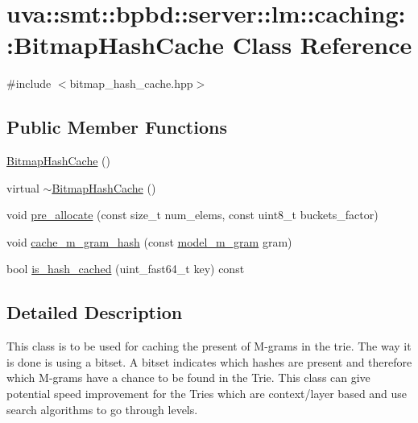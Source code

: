 \hypertarget{classuva_1_1smt_1_1bpbd_1_1server_1_1lm_1_1caching_1_1_bitmap_hash_cache}{}\section{uva\+:\+:smt\+:\+:bpbd\+:\+:server\+:\+:lm\+:\+:caching\+:\+:Bitmap\+Hash\+Cache Class Reference}
\label{classuva_1_1smt_1_1bpbd_1_1server_1_1lm_1_1caching_1_1_bitmap_hash_cache}


{\ttfamily \#include $<$bitmap\+\_\+hash\+\_\+cache.\+hpp$>$}

\subsection*{Public Member Functions}
\begin{DoxyCompactItemize}
\item 
\hyperlink{classuva_1_1smt_1_1bpbd_1_1server_1_1lm_1_1caching_1_1_bitmap_hash_cache_a17b25628aeb35ab8e652e4d122e7207e}{Bitmap\+Hash\+Cache} ()
\item 
virtual \hyperlink{classuva_1_1smt_1_1bpbd_1_1server_1_1lm_1_1caching_1_1_bitmap_hash_cache_ad49f58d1a8c1eb42f8d087dc3113ceb6}{$\sim$\+Bitmap\+Hash\+Cache} ()
\item 
void \hyperlink{classuva_1_1smt_1_1bpbd_1_1server_1_1lm_1_1caching_1_1_bitmap_hash_cache_a6855f0989c36321f0a6faed788adfe20}{pre\+\_\+allocate} (const size\+\_\+t num\+\_\+elems, const uint8\+\_\+t buckets\+\_\+factor)
\item 
void \hyperlink{classuva_1_1smt_1_1bpbd_1_1server_1_1lm_1_1caching_1_1_bitmap_hash_cache_a26c8629c18ae22880573e68d1b27ba3e}{cache\+\_\+m\+\_\+gram\+\_\+hash} (const \hyperlink{classuva_1_1smt_1_1bpbd_1_1server_1_1lm_1_1m__grams_1_1model__m__gram}{model\+\_\+m\+\_\+gram} gram)
\item 
bool \hyperlink{classuva_1_1smt_1_1bpbd_1_1server_1_1lm_1_1caching_1_1_bitmap_hash_cache_af7668c2ab9812617309316a788f29466}{is\+\_\+hash\+\_\+cached} (uint\+\_\+fast64\+\_\+t key) const 
\end{DoxyCompactItemize}


\subsection{Detailed Description}
This class is to be used for caching the present of M-\/grams in the trie. The way it is done is using a bitset. A bitset indicates which hashes are present and therefore which M-\/grams have a chance to be found in the Trie. This class can give potential speed improvement for the Tries which are context/layer based and use search algorithms to go through levels. 

